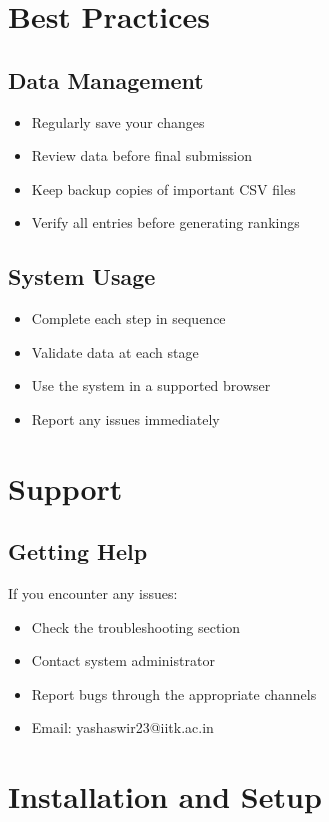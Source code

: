 \documentclass[12pt,a4paper]{article}
\begin{document}
\section{Best Practices}
\subsection{Data Management}
\begin{itemize}
    \item Regularly save your changes
    \item Review data before final submission
    \item Keep backup copies of important CSV files
    \item Verify all entries before generating rankings
\end{itemize}

\subsection{System Usage}
\begin{itemize}
    \item Complete each step in sequence
    \item Validate data at each stage
    \item Use the system in a supported browser
    \item Report any issues immediately
\end{itemize}

\section{Support}
\subsection{Getting Help}
If you encounter any issues:
\begin{itemize}
    \item Check the troubleshooting section
    \item Contact system administrator
    \item Report bugs through the appropriate channels
    \item Email: yashaswir23@iitk.ac.in
\end{itemize}

\section{Installation and Setup}
\end{document}
